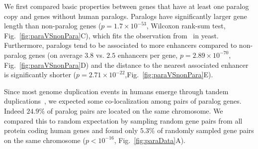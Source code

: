 \documentclass[a4paper,twoside=true,openright,parskip=full,chapterprefix=true,11pt,headings=normal,bibliography=totoc,listof=totoc,titlepage=on,captions=tableabove,draft=false]{scrreprt}
\theoremstyle{definition}
\theoremstyle{definition}
\theoremstyle{definition}
\theoremstyle{remark}
\begin{document}
We first compared basic properties between genes that have at least one
paralog copy and genes without human paralogs. Paralogs have
significantly larger gene length than non-paralog genes
(\(p = 1.7 \times 10^{-53}\), Wilcoxon rank-sum test,
Fig.~\ref{fig:paraVSnonPara}C), which fits the observation
from~\citep{He2005} in yeast. Furthermore, paralogs tend to be
associated to more enhancers compared to non-paralog genes (on average
\(3.8\) vs. \(2.5\) enhancers per gene, \(p=2.89\times10^{-70}\),
Fig.~\ref{fig:paraVSnonPara}D) and the distance to the nearest
associated enhancer is significantly shorter
(\(p=2.71\times10^{-22}\),Fig.~\ref{fig:paraVSnonPara}E).

Since most genome duplication events in humans emerge through tandem
duplications~\citep{Newman2015}, we expected some co-localization among
pairs of paralog genes. Indeed \(24.9\%\) of paralog pairs are located
on the same chromosome. We compared this to random expectation by
sampling random gene pairs from all protein coding human genes and found
only \(5.3\%\) of randomly sampled gene pairs on the same chromosome
(\(p<10^{-16}\), Fig.~\ref{fig:paraData}A).
\end{document}
